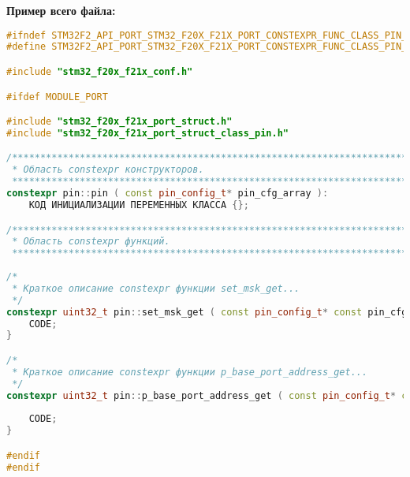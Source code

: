\textbf{Пример всего файла:}\begin{lstlisting}[language=C++, frame=tlBR, basicstyle=\fontsize{10}{10}\ttfamily]
#ifndef STM32F2_API_PORT_STM32_F20X_F21X_PORT_CONSTEXPR_FUNC_CLASS_PIN_H_
#define STM32F2_API_PORT_STM32_F20X_F21X_PORT_CONSTEXPR_FUNC_CLASS_PIN_H_

#include "stm32_f20x_f21x_conf.h"

#ifdef MODULE_PORT

#include "stm32_f20x_f21x_port_struct.h"
#include "stm32_f20x_f21x_port_struct_class_pin.h"

/**********************************************************************
 * Область constexpr конструкторов.
 **********************************************************************/
constexpr pin::pin ( const pin_config_t* pin_cfg_array ):
	КОД ИНИЦИАЛИЗАЦИИ ПЕРЕМЕННЫХ КЛАССА {};

/**********************************************************************
 * Область constexpr функций.
 **********************************************************************/
 
/*
 * Краткое описание constexpr функции set_msk_get...
 */
constexpr uint32_t pin::set_msk_get ( const pin_config_t* const pin_cfg_array ) {
	CODE;
}

/*
 * Краткое описание constexpr функции p_base_port_address_get...
 */
constexpr uint32_t pin::p_base_port_address_get ( const pin_config_t* const 
																									pin_cfg_array ) {
	CODE;
}

#endif
#endif
 \end{lstlisting}

